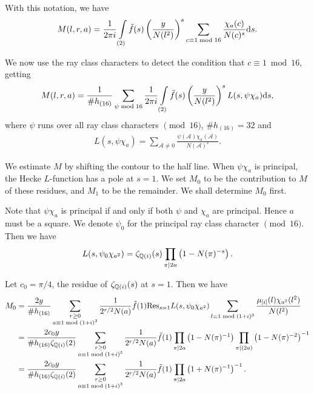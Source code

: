 \documentclass[twoside,leqno,10pt, A4]{amsart}
\begin{document}
    With this notation, we have
\begin{align*}
  M(l,r,a) = \frac 1{2\pi i}\int\limits_{(2)}\tilde{f}(s) \left( \frac{y}{N(l^2)} \right)^s\sum_{c \equiv 1 \bmod {16}}\frac {\chi_a(c)}{N(c)^s} \mathrm{d} s.
\end{align*}

   We now use the ray class characters to detect the
condition that $c \equiv 1 \bmod {16}$, getting
\begin{align*}
  M(l,r,a)=\frac {1}{\#h_{(16)}}\sum_{\psi \bmod {16}}\frac {1}{2\pi
   i}\int\limits\limits_{(2)}\tilde{f}(s) \left( \frac{y}{N(l^2)} \right)^s L(s, \psi\chi_a)\mathrm{d} s,
\end{align*}
   where $\psi$ runs over all ray class characters $\pmod {16}$, $\#h_{(16)}=32$ and
\begin{align*}
   L(s, \psi\chi_a)=\sum_{\mathcal{A} \neq 0} \frac{\psi(\mathcal{A})\chi_a(\mathcal{A})}{N(\mathcal{A})^s}.
\end{align*}

   We estimate $M$ by shifting the contour to the half line. When $\psi\chi_a$ is principal, the Hecke $L$-function
has a pole at $s = 1$. We set $M_0$ to be the contribution to $M$ of these residues, and $M_1$ to be the
remainder. We shall determine $M_0$ first. \newline

    Note that $\psi\chi_a$ is principal if and only if both $\psi$ and $\chi_a$ are principal. Hence $a$ must be a square. We denote $\psi_0$ for the principal
    ray class character $\pmod {16}$. Then we have
\begin{align*}
   L(s, \psi_0\chi_{a^2})=\zeta_{\mathbb Q(i)}(s)\prod_{\pi |2a} \left(1-N(\pi)^{-s} \right).
\end{align*}

   Let $c_0=\pi/4$, the residue of $\zeta_{\mathbb Q(i)}(s)$ at $s=1$.  Then we have
\begin{align*}
  M_0 &=\frac {2y}{\#h_{(16)}} \sum_{\substack{r \geq 0 \\ a \equiv 1 \bmod {(1+i)^3}}} \frac{1}{2^{r/2}N(a)}\tilde{f}(1)\text{Res}_{s=1}L(s, \psi_0\chi_{a^2})\sum_{l \equiv 1 \bmod (1+i)^3} \frac{\mu_{[i]}(l)\chi_{a^2}(l^2)}{N(l^2)}  \\
  &=\frac {2c_0y}{\#h_{(16)}\zeta_{\mathbb Q(i)}(2)} \sum_{\substack{r \geq 0 \\ a \equiv 1 \bmod {(1+i)^3}}} \frac{1}{2^{r/2}N(a)}\tilde{f}(1)\prod_{\pi |
  2a}\left( 1-N(\pi)^{-1} \right)\prod_{\pi | (2a)} \left( 1-N(\pi)^{-2} \right)^{-1} \\
  &=\frac {2c_0y}{\#h_{(16)}\zeta_{\mathbb Q(i)}(2)} \sum_{\substack{r \geq 0 \\ a \equiv 1 \bmod {(1+i)^3}}} \frac{1}{2^{r/2}N(a)}\tilde{f}(1)\prod_{\pi |
  2a} \left( 1+N(\pi)^{-1} \right)^{-1}.
\end{align*}
\end{document}
